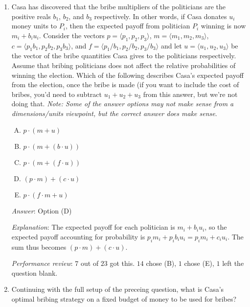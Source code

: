 \documentclass[10pt]{amsart}
\begin{document}
\begin{enumerate}
\item Casa has discovered that the bribe multipliers of the
  politicians are the positive reals $b_1$, $b_2$, and $b_3$
  respectively. In other words, if Casa donates $u_i$ money units to
  $P_i$, then the expected payoff from politician $P_i$ winning is now
  $m_i + b_iu_i$. Consider the vectors $p = \langle p_1,p_2,p_3
  \rangle$, $m = \langle m_1,m_2,m_3 \rangle$, $c = \langle p_1b_1,
  p_2b_2, p_3b_3 \rangle$, and $f = \langle p_1/b_1, p_2/b_2, p_3/b_3
  \rangle$ and let $u = \langle u_1,u_2,u_3\rangle$ be the vector of
  the bribe quantities Casa gives to the politicians
  respectively. Assume that bribing politicians does not affect the
  relative probabilities of winning the election. Which of the
  following describes Casa's expected payoff from the election, once
  the bribe is made (if you want to include the cost of bribes, you'd
  need to subtract $u_1 + u_2 + u_3$ from this answer, but we're not
  doing that. {\em Note: Some of the answer options may not make sense
  from a dimensions/units viewpoint, but the correct answer does make
  sense}.

  \begin{enumerate}[(A)]
  \item $p \cdot (m + u)$
  \item $p \cdot (m + (b \cdot u))$
  \item $p \cdot (m + (f \cdot u))$
  \item $(p \cdot m) + (c \cdot u)$
  \item $p \cdot (f \cdot m + u)$
  \end{enumerate}

  {\em Answer}: Option (D)

  {\em Explanation}: The expected payoff for each politician is $m_i +
  b_iu_i$, so the expected payoff accounting for probability is
  $p_im_i + p_ib_iu_i = p_im_i + c_iu_i$. The sum thus becomes $(p
  \cdot m) + (c \cdot u)$.

  {\em Performance review}: $7$ out of $23$ got this. $14$ chose (B),
  $1$ chose (E), $1$ left the question blank.

\item Continuing with the full setup of the preceing question, what is
  Casa's optimal bribing strategy on a fixed budget of money to be
  used for bribes?


\end{enumerate}
\end{document}
